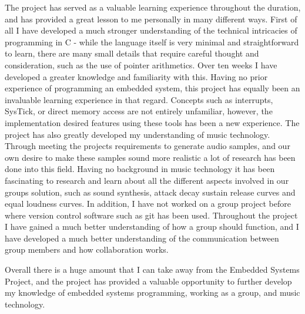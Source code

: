 The project has served as a valuable learning experience throughout the duration, 
and has provided a great lesson to me personally in many different ways. 
First of all I have developed a much stronger understanding of the technical 
intricacies of programming in C - while the language itself is very minimal and 
straightforward to learn, there are many small details that require careful 
thought and consideration, such as the use of pointer arithmetics. Over ten weeks 
I have developed a greater knowledge and familiarity with this. 
Having no prior experience of programming an embedded system, this project has 
equally been an invaluable learning experience in that regard. 
Concepts such as interrupts, SysTick, or direct memory access are not entirely 
unfamiliar, however, the implementation desired features using these tools has 
been a new experience.
The project has also greatly developed my understanding of music technology. 
Through meeting the projects requirements to generate audio samples, and our own 
desire to make these samples sound more realistic a lot of research has been done 
into this field. 
Having no background in music technology it has been fascinating to research and 
learn about all the different aspects involved in our groups solution, such as 
sound synthesis, attack decay sustain release curves and equal loudness curves.
In addition, I have not worked on a group project before where version control 
software such as git has been used. Throughout the project I have gained a much 
better understanding of how a group should function, and I have developed a much 
better understanding of the communication between group members and how 
collaboration works. 
\par\bigskip\noindent
Overall there is a huge amount that I can take away from the Embedded Systems 
Project, and the project has provided a valuable opportunity to further develop 
my knowledge of embedded systems programming, working as a group, and music 
technology. 
